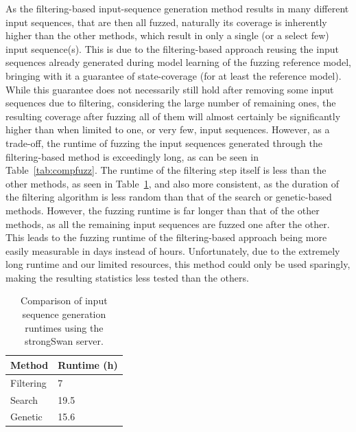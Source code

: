 As the filtering-based input-sequence generation method results in many different input sequences, that are then all fuzzed, naturally its coverage is inherently higher than the other methods, which result in only a single (or a select few) input sequence(s). This is due to the filtering-based approach reusing the input sequences already generated during model learning of the fuzzing reference model, bringing with it a guarantee of state-coverage (for at least the reference model). While this guarantee does not necessarily still hold after removing some input sequences due to filtering, considering the large number of remaining ones, the resulting coverage after fuzzing all of them will almost certainly be significantly higher than when limited to one, or very few, input sequences. However, as a trade-off, the runtime of fuzzing the input sequences generated through the filtering-based method is exceedingly long, as can be seen in Table~\ref{tab:compfuzz}. The runtime of the filtering step itself is less than the other methods, as seen in Table~\ref{tab:comprun}, and also more consistent, as the duration of the filtering algorithm is less random than that of the search or genetic-based methods. However, the fuzzing runtime is far longer than that of the other methods, as all the remaining input sequences are fuzzed one after the other. This leads to the fuzzing runtime of the filtering-based approach being more easily measurable in days instead of hours. Unfortunately, due to the extremely long runtime and our limited resources, this method could only be used sparingly, making the resulting statistics less tested than the others. 

\vspace{3mm}
\begin{table}[H]
	\centering
	\begin{tabular}{|l|l|}
		\hline
		\rowcolor[HTML]{EFEFEF} 
		\textbf{Method} & \textbf{Runtime (h)}   \\ \hline
		Filtering		            &  7	     \\ \hline
		Search              		&  19.5      \\ \hline
		Genetic              		&  15.6       \\ \hline
	\end{tabular}
	\caption{Comparison of input sequence generation runtimes using the strongSwan server.}
	\label{tab:comprun}
\end{table}

